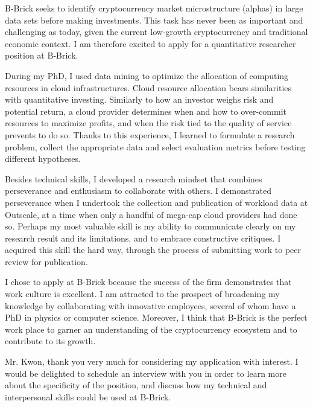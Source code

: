 B-Brick seeks to identify cryptocurrency market microstructure (alphas) in large data sets before making investments. 
This task has never been as important and challenging as today, given the current low-growth cryptocurrency and traditional economic context.  
I am therefore excited to apply for a quantitative researcher position at B-Brick. 

During my PhD, I used data mining to optimize the allocation of computing resources in cloud infrastructures. 
Cloud resource allocation bears similarities with quantitative investing.  
Similarly to how an investor weighs risk and potential return, a cloud provider determines when and how to over-commit resources to maximize profits, and when the risk tied to the quality of service prevents to do so. 
Thanks to this experience, I learned to formulate a research problem, collect the appropriate data and select evaluation metrics before testing different hypotheses. 

Besides technical skills, I developed a research mindset that combines perseverance and enthusiasm to collaborate with others. 
I demonstrated perseverance when I undertook the collection and publication of workload data at Outscale, at a time when only a handful of mega-cap cloud providers had done so. 
Perhaps my most valuable skill is my ability to communicate clearly on my research result and its limitations, and to embrace constructive critiques. 
I acquired this skill the hard way, through the process of submitting work to peer review for publication. 

I chose to apply at B-Brick because the success of the firm demonstrates that work culture is excellent. 
I am attracted to the prospect of broadening my knowledge by collaborating with innovative employees, several of whom have a PhD in physics or computer science. 
Moreover, I think that B-Brick is the perfect work place to garner an understanding of the cryptocurrency ecosystem and to contribute to its growth. 

Mr. Kwon, thank you very much for considering my application with interest. 
I would be delighted to schedule an interview with you in order to learn more about the specificity of the position, and discuss how my technical and interpersonal skills could be used at B-Brick. 
